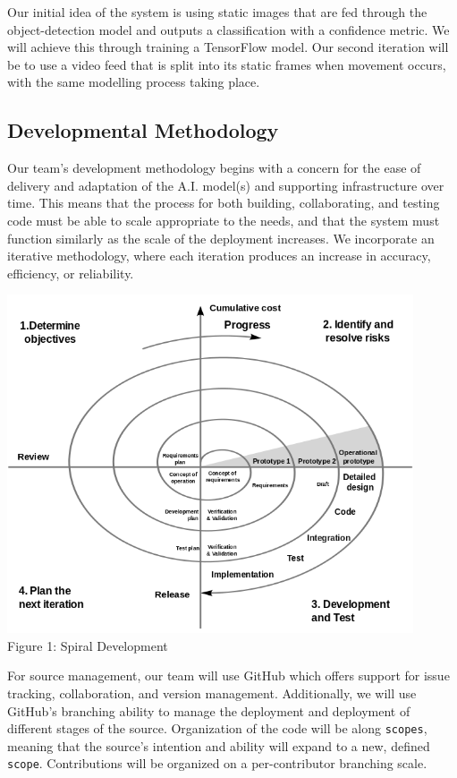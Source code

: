\documentclass[12pt,twoside]{article}
\begin{document}
Our initial idea of the system is using static images that are fed through the object-detection model and outputs a classification with a confidence metric. We will achieve this through training a TensorFlow model. Our second iteration will be to use a video feed that is split into its static frames when movement occurs, with the same modelling process taking place.

\subsection{Developmental Methodology}
Our team's development methodology begins with a concern for the ease of delivery and adaptation of the A.I. model(s) and supporting infrastructure over time. This means that the process for both building, collaborating, and testing code must be able to scale appropriate to the needs, and that the system must function similarly as the scale of the deployment increases. We incorporate an iterative methodology, where each iteration produces an increase in accuracy, efficiency, or reliability.\\

\begin{center}
\includegraphics[width = 12cm]{./figures/spiral-model}\\
Figure 1: Spiral Development\\
\end{center}

For source management, our team will use GitHub which offers support for issue tracking, collaboration, and version management. Additionally, we will use GitHub's branching ability to manage the deployment and deployment of different stages of the source. Organization of the code will be along \verb|scopes|, meaning that the source's intention and ability will expand to a new, defined \verb|scope|. Contributions will be organized on a per-contributor branching scale.\\
\end{document}
